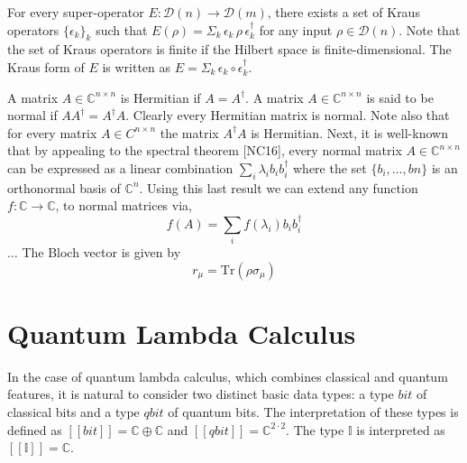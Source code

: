 For every super-operator $ E: \mathcal{D}(n) \xrightarrow{} \mathcal{D}(m)$, there exists a set of Kraus operators $\{\epsilon_{k}\}_{k}$ such that $ E(\rho)= \Sigma_{k} \hspace{2pt} \epsilon_{k}\hspace{2pt} \rho \hspace{2pt} \epsilon_{k}^{\dag}$  for any input $\rho \in  \mathcal{D}(n) $. Note that the set of Kraus operators is finite if the Hilbert space is finite-dimensional. The Kraus form of $E$ is written as $E = \Sigma_{k} \hspace{2pt} \epsilon_{k} \circ  \epsilon_{k}^{\dag}$.

A matrix $A \in  \mathbb{C}^{n\times n}$ is Hermitian if $A = A^{\dag}$.
A matrix $A \in \mathbb{C}^{n\times n}$ is said to be normal if $AA^{\dag} =  A^{\dag}A$. Clearly every Hermitian matrix is normal. Note also that for every matrix $A \in C^{n\times n}$ the matrix $A^{\dag}A$ is Hermitian. Next, it is well-known that by appealing to the spectral theorem [NC16], every normal matrix $A \in  \mathbb{C}^{n\times n}$ can be expressed as a linear combination $\sum_{i} \lambda_{i}b_{i}b_{i}^{\dag}$ where the set $\{b_{i}, \ldots , b{n}\}$ is an orthonormal basis of $\mathbb{C}^{n}$. Using this last result we can extend any function $f:\mathbb{C} \xrightarrow{} \mathbb{C}$, to normal matrices via,
\begin{equation} \label{eq:apply_f_diag}
  f(A) = \sum_{i} f(\lambda_{i})b_{i}b_{i}^{\dag}
\end{equation}
$\ldots$
The Bloch vector is given by 
\begin{equation}
  \label{eq:Bloch_vector}
  r_{\mu} = \text{Tr}(\rho \sigma_{\mu})
  \end{equation}




\section{Quantum Lambda Calculus}




In the case of quantum lambda calculus, which combines classical and quantum features, it is natural to consider two distinct basic data types: a type $\textit{bit}$ of classical bits and a type $\textit{qbit}$ of quantum bits.  The interpretation of these types is defined as  $[\![\textit{bit}]\!]=\mathbb{C}\oplus\mathbb{C}$ and $[\![\textit{qbit}]\!]=\mathbb{C}^{2\cdot 2}$. The type $\mathbb{I}$ is interpreted as $[\![\mathbb{I}]\!]=\mathbb{C}$.

